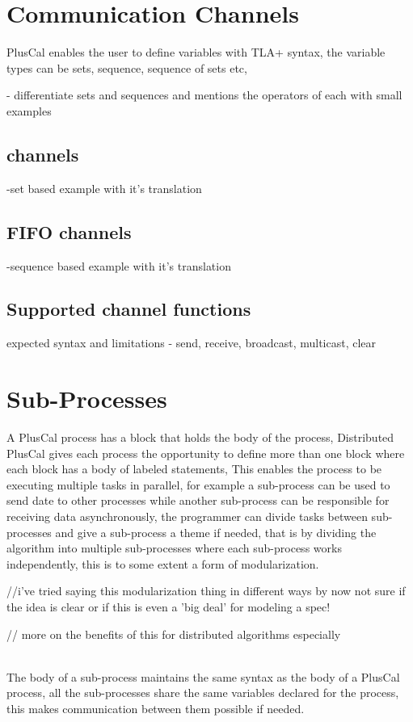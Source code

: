 \documentclass{thesul}
\begin{document}
\section{Communication Channels}

PlusCal enables the user to define variables with TLA+ syntax, the variable types can be sets, sequence, sequence of sets etc, 

- differentiate sets and sequences and mentions the operators of each with small examples


\subsection{channels}
-set based 
example with it's translation
\subsection{FIFO channels}
-sequence based
example with it's translation
\subsection{Supported channel functions}
expected syntax and limitations
- send, receive, broadcast, multicast, clear
\section{Sub-Processes}

A PlusCal process has a block that holds the body of the process, Distributed PlusCal gives each process the opportunity to define more than one block where each block has a body of labeled statements, This enables the process to be executing multiple tasks in parallel, for example a sub-process can be used to send date to other processes while another sub-process can be responsible for receiving data asynchronously, the programmer can divide tasks between sub-processes and give a sub-process a theme  if needed, that is by dividing the algorithm into multiple sub-processes where each sub-process works independently, this is to some extent a form of modularization.

//i've tried saying this modularization thing in different ways by now not sure if the idea is clear or if this is even a 'big deal' for modeling a spec!

// more on the benefits of this for distributed algorithms especially

\hfill\\
The body of a sub-process maintains the same syntax as the body of a PlusCal process, all the sub-processes share the same variables declared for the process, this makes communication between them possible if needed.
\end{document}
